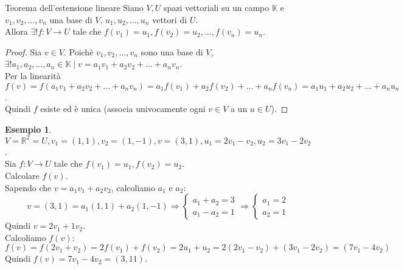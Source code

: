 \documentclass[a4paper]{article}
\theoremstyle{definition}
\newtheorem*{es}{Esempio}
\begin{document}
\begin{teo}{Teorema dell'estensione lineare}{}
	Siano $V, U$ spazi vettoriali su un campo $\mathbb{K}$ e $v_1, v_2, ..., v_n$ una base di $V$,
	$u_1, u_2, ..., u_n$ vettori di $U$. \\
	Allora $\exists! f: V \rightarrow U$ tale che $f(v_1) = u_1, f(v_2) = u_2, ..., f(v_n) = u_n$.
\end{teo}
\begin{proof}
	Sia $v \in V$. Poichè $v_1, v_2, ..., v_n$ sono una base di $V$, $\exists! a_1, a_2, ..., a_n \in \mathbb{K} \mid v = a_1v_1 + a_2v_2 + ... + a_nv_n$. \\
	Per la linearità $f(v) = f(a_1v_1 + a_2v_2 + ... + a_nv_n) = a_1f(v_1) + a_2f(v_2) + ... + a_nf(v_n) = a_1u_1 + a_2u_2 + ... + a_nu_n$. \\
	Quindi $f$ esiste ed è unica (associa univocamente ogni $v \in V$ a un $u \in U$).
\end{proof}

\begin{es}
	$V = \mathbb{R}^2 = U, v_1 = (1, 1), v_2 = (1, -1), v = (3, 1), u_1 = 2v_1 - v_2, u_2 = 3v_1 - 2v_2$. \\
	Sia $f: V \rightarrow U$ tale che $f(v_1) = u_1, f(v_2) = u_2$. \\
	Calcolare $f(v)$. \\
	Sapendo che $v = a_1v_1 + a_2v_2$, calcoliamo $a_1$ e $a_2$:
	\begin{equation*}
		v = (3, 1) = a_1(1, 1) + a_2(1, -1) \Rightarrow \begin{cases}
			              a_1 + a_2 = 3 \\
			              a_1 - a_2 = 1
		              \end{cases} \Rightarrow \begin{cases}
			            a_1 = 2 \\
			            a_2 = 1
		            \end{cases}
	\end{equation*}
	Quindi $v = 2v_1 + 1v_2$. \\
	Calcoliamo $f(v)$:
	\begin{equation*}
		f(v) = f(2v_1 + v_2) = 2f(v_1) + f(v_2) = 2u_1 + u_2 = 2(2v_1 - v_2) + (3v_1 - 2v_2) = (7v_1 - 4v_2)
	\end{equation*}
	Quindi $f(v) = 7v_1 - 4v_2 = (3, 11)$.
\end{es}
\end{document}
